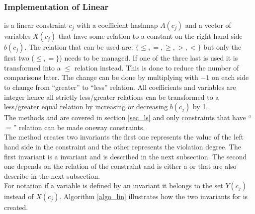 \subsubsection{Implementation of Linear}
 is a linear constraint $c_j$ with a coefficient hashmap $A(c_j)$ and a vector of variables $X(c_j)$ 
that have some relation to a constant on the right hand side $b(c_j)$. The relation that can be used are: 
$\{\leq,=,\geq,>,<\}$ 
but only the first two ($\leq,=\}$) needs to be managed. If one of the three last is used it is transformed into a 
$\leq$ relation instead. This is done to reduce the number of comparisons later. The change can be done by multiplying 
with $-1$ on each side to change from ``greater'' to ``less'' relation. All coefficients and variables are integer hence 
all strictly less/greater relations can be transformed to a less/greater equal relation by increasing or decreasing 
$b(c_j)$ by 1. \\
The methods  and  are covered in section \ref{sec_ls} and only 
 constraints that have ``$=$'' relation can be made oneway constraints. \\ 
The method  creates two invariants the first one represents the value of the left hand side in 
the constraint and the other represents the violation degree. The first invariant is a  invariant and is 
described in the next subsection. The second one depends on the relation of the constraint and is either a 
 or 
 that are also describe in the next subsection. \\
For notation if a variable is defined by an invariant it belongs to the set $Y(c_j)$ instead of $X(c_j)$. Algorithm 
\ref{algo_lin} illustrates how the two invariants for  is created. \\
\IncMargin{1em}
